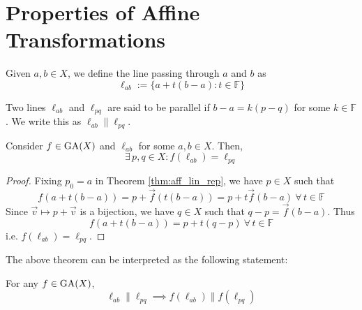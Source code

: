 \section{Properties of Affine Transformations}

\begin{definition}
    Given $a,b \in X$, we define the line passing through $a$ and $b$ as
    \[ \ell_{ab}:=\{a+t(b-a): t\in\mathbb{F}\} \]
\end{definition}

\begin{definition}
    Two lines $\ell_{ab}$ and $\ell_{pq}$ are said to be parallel if
    $b-a=k(p-q)$ for some $k\in\mathbb{F}$. We write this
    as $\ell_{ab}\parallel\ell_{pq}$.
\end{definition}

\begin{theorem}
    Consider $f\in\operatorname{GA}(X)$ and $\ell_{ab}$ for some $a,b \in X$. Then,
    \[ \exists\,p,q \in X: f(\ell_{ab})=\ell_{pq} \]
\end{theorem}

\begin{proof}
    Fixing $p_0=a$ in Theorem \ref{thm:aff_lin_rep}, we have $p \in X$ such that
    \[ f(a+t(b-a))=p+\vec{f}(t(b-a))=p+t\vec{f}(b-a)\ \forall\,t\in\mathbb{F} \]
    Since $\vec{v} \mapsto p+\vec{v}$ is a bijection, we have $q \in X$ such that
    $q-p=\vec{f}(b-a)$. Thus
    \[ f(a+t(b-a))=p+t(q-p)\ \forall\,t\in\mathbb{F} \]
    i.e. $f(\ell_{ab})=\ell_{pq}$.
\end{proof}

The above theorem can be interpreted as the following statement:
\vspace{1ex}

\begin{center}
\end{center}
\vspace{1ex}

\begin{theorem}
    For any $f\in\operatorname{GA}(X)$,
    \[ \ell_{ab} \parallel \ell_{pq} \implies f(\ell_{ab}) \parallel f(\ell_{pq}) \]
\end{theorem}


